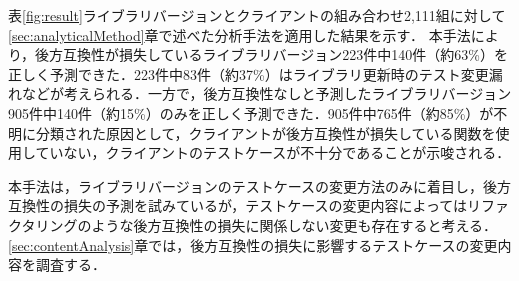 \documentclass[submit]{ipsj}
\begin{document}
表\ref{fig:result}ライブラリバージョンとクライアントの組み合わせ2,111組に対して\ref{sec:analyticalMethod}章で述べた分析手法を適用した結果を示す．
本手法により，後方互換性が損失しているライブラリバージョン223件中140件（約63\%）を正しく予測できた．223件中83件（約37\%）はライブラリ更新時のテスト変更漏れなどが考えられる．一方で，後方互換性なしと予測したライブラリバージョン905件中140件（約15\%）のみを正しく予測できた．905件中765件（約85\%）が不明に分類された原因として，クライアントが後方互換性が損失している関数を使用していない，クライアントのテストケースが不十分であることが示唆される．

本手法は，ライブラリバージョンのテストケースの変更方法のみに着目し，後方互換性の損失の予測を試みているが，テストケースの変更内容によってはリファクタリングのような後方互換性の損失に関係しない変更も存在すると考える．\ref{sec:contentAnalysis}章では，後方互換性の損失に影響するテストケースの変更内容を調査する．



\begin{table}[t]
  \centering
  \caption{分析結果}
  \label{fig:result}
  \vspace{-5mm}
\end{table}
\end{document}
